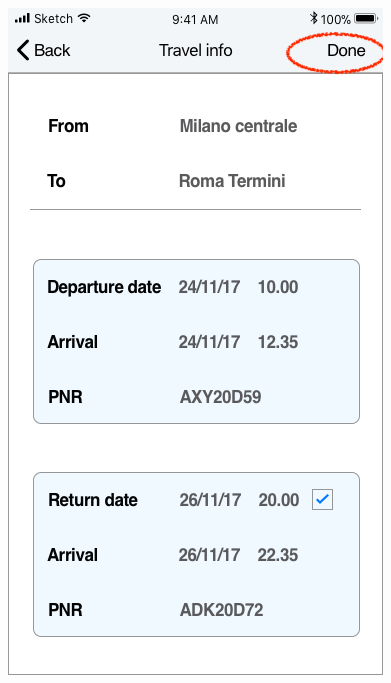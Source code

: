 \begin{figure}[H]
\end{figure}
\begin{figure}[H]
	\centering
	\includegraphics[scale=0.23]{Images/Interface/Trips/14_form}
	\hspace{0.5cm}

\end{figure}
